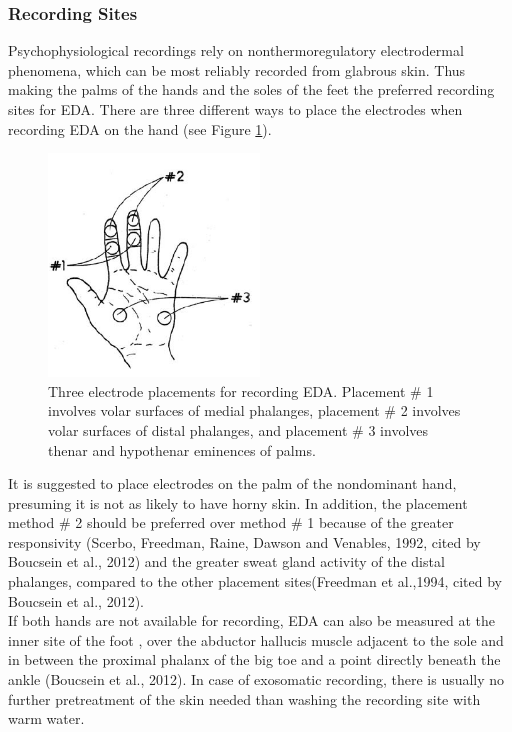 \subsubsection*{Recording Sites}
Psychophysiological recordings rely on nonthermoregulatory electrodermal phenomena, which can be most reliably recorded from glabrous skin. Thus making the palms of the hands and the soles of the feet the preferred recording sites for EDA. There are three different ways to place the electrodes when recording EDA on the hand (see Figure \ref{PalmImg}).

\begin{figure}[ht]
\centering
\includegraphics[width=0.5\textwidth]{images/electrodePlacement.png}
\caption{Three electrode placements for recording EDA. Placement \# 1 involves volar surfaces of medial phalanges, placement \# 2 involves volar surfaces of distal phalanges, and placement \# 3 involves thenar and hypothenar eminences of palms.\citep{HANDBOOKPP}}
\label{PalmImg}
\end{figure}

It is suggested to place electrodes on the palm of the nondominant hand, presuming it is not as likely to have horny skin. In addition, the placement method \# 2 should be preferred over method \# 1 because of the greater responsivity (Scerbo, Freedman, Raine, Dawson and Venables, 1992, cited by Boucsein et al., 2012) and the greater sweat gland activity of the distal phalanges, compared to the other placement sites(Freedman et al.,1994, cited by Boucsein et al., 2012).\\
If both hands are not available for recording, EDA can also be measured at the inner site of the foot , over the abductor hallucis muscle adjacent to the sole and in between the proximal phalanx of the big toe and a point directly beneath the ankle (Boucsein et al., 2012). In case of exosomatic recording, there is usually no further pretreatment of the skin needed than washing the recording site with warm water.

